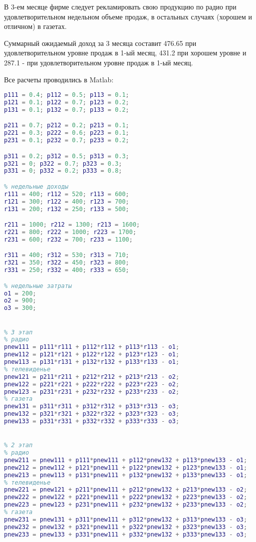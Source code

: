 \documentclass[14pt,a4paper,report]{report}
\begin{document}
В 3-ем месяце фирме следует рекламировать свою продукцию по радио при удовлетворительном недельном объеме продаж, в остальных случаях (хорошем и отличном) в газетах.

Суммарный ожидаемый доход за 3 месяца составит 476.65   при удовлетворительном  уровне продаж в 1-ый месяц, 431.2 при хорошем уровне и 287.1 - при удовлетворительном уровне продаж в 1-ый месяц.


Все расчеты проводились в Matlab:
\begin{lstlisting}[language={matlab}, caption={скрипт}, basicstyle=\ttfamily]
% матрицы переходных вероятностей 
p111 = 0.4; p112 = 0.5; p113 = 0.1;
p121 = 0.1; p122 = 0.7; p123 = 0.2;
p131 = 0.1; p132 = 0.7; p133 = 0.2;

p211 = 0.7; p212 = 0.2; p213 = 0.1;
p221 = 0.3; p222 = 0.6; p223 = 0.1;
p231 = 0.1; p232 = 0.7; p233 = 0.2;

p311 = 0.2; p312 = 0.5; p313 = 0.3;
p321 = 0; p322 = 0.7; p323 = 0.3;
p331 = 0; p332 = 0.2; p333 = 0.8;

% недельные доходы
r111 = 400; r112 = 520; r113 = 600;
r121 = 300; r122 = 400; r123 = 700;
r131 = 200; r132 = 250; r133 = 500;

r211 = 1000; r212 = 1300; r213 = 1600;
r221 = 800; r222 = 1000; r223 = 1700;
r231 = 600; r232 = 700; r233 = 1100;

r311 = 400; r312 = 530; r313 = 710;
r321 = 350; r322 = 450; r323 = 800;
r331 = 250; r332 = 400; r333 = 650;

% недельные затраты
o1 = 200;
o2 = 900;
o3 = 300;


% 3 этап
% радио
pnew111 = p111*r111 + p112*r112 + p113*r113 - o1;
pnew112 = p121*r121 + p122*r122 + p123*r123 - o1;
pnew113 = p131*r131 + p132*r132 + p133*r133 - o1;
% телевиденье
pnew121 = p211*r211 + p212*r212 + p213*r213 - o2;
pnew122 = p221*r221 + p222*r222 + p223*r223 - o2;
pnew123 = p231*r231 + p232*r232 + p233*r233 - o2;
% газета
pnew131 = p311*r311 + p312*r312 + p313*r313 - o3;
pnew132 = p321*r321 + p322*r322 + p323*r323 - o3;
pnew133 = p331*r331 + p332*r332 + p333*r333 - o3;


% 2 этап
% радио
pnew211 = pnew111 + p111*pnew111 + p112*pnew132 + p113*pnew133 - o1;
pnew212 = pnew112 + p121*pnew111 + p122*pnew132 + p123*pnew133 - o1;
pnew213 = pnew113 + p131*pnew111 + p132*pnew132 + p133*pnew133 - o1;
% телевиденье
pnew221 = pnew121 + p211*pnew111 + p212*pnew132 + p213*pnew133 - o2;
pnew222 = pnew122 + p221*pnew111 + p222*pnew132 + p223*pnew133 - o2;
pnew223 = pnew123 + p231*pnew111 + p232*pnew132 + p233*pnew133 - o2;
% газета
pnew231 = pnew131 + p311*pnew111 + p312*pnew132 + p313*pnew133 - o3;
pnew232 = pnew132 + p321*pnew111 + p322*pnew132 + p323*pnew133 - o3;
pnew233 = pnew133 + p331*pnew111 + p332*pnew132 + p333*pnew133 - o3;



\end{lstlisting}
\end{document}
